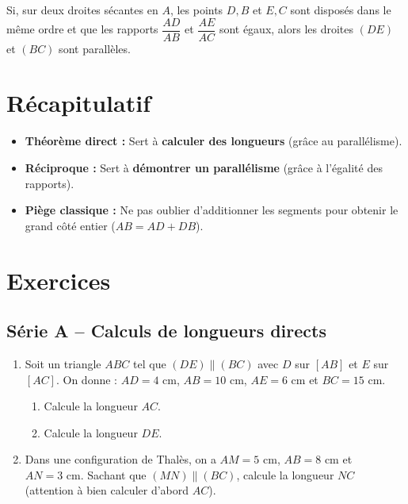 \documentclass[../main.tex]{subfiles}
\begin{document}
\begin{propriete}[Réciproque]
Si, sur deux droites sécantes en $A$, les points $D, B$ et $E, C$ sont disposés dans le même ordre et que les rapports $\dfrac{AD}{AB}$ et $\dfrac{AE}{AC}$ sont égaux, alors les droites $(DE)$ et $(BC)$ sont parallèles.
\end{propriete}

\section{Récapitulatif}

\begin{tcolorbox}[colback=gray!6,colframe=gray!60!black,title={\bfseries À retenir}]
\begin{itemize}
  \item \textbf{Théorème direct :} Sert à \textbf{calculer des longueurs} (grâce au parallélisme).
  \item \textbf{Réciproque :} Sert à \textbf{démontrer un parallélisme} (grâce à l'égalité des rapports).
  \item \textbf{Piège classique :} Ne pas oublier d'additionner les segments pour obtenir le grand côté entier ($AB = AD + DB$).
\end{itemize}
\end{tcolorbox}

\newpage
\section{Exercices}

\subsection{Série A -- Calculs de longueurs directs}

\begin{enumerate}[label=\textbf{\arabic*.}]
\item Soit un triangle $ABC$ tel que $(DE) \parallel (BC)$ avec $D$ sur $[AB]$ et $E$ sur $[AC]$.
On donne : $AD = 4\text{ cm}$, $AB = 10\text{ cm}$, $AE = 6\text{ cm}$ et $BC = 15\text{ cm}$.
\begin{enumerate}[label=\alph*)]
  \item Calcule la longueur $AC$.
  \item Calcule la longueur $DE$.
\end{enumerate}

\item Dans une configuration de Thalès, on a $AM = 5\text{ cm}$, $AB = 8\text{ cm}$ et $AN = 3\text{ cm}$. Sachant que $(MN) \parallel (BC)$, calcule la longueur $NC$ (attention à bien calculer d'abord $AC$).
\end{enumerate}
\end{document}
